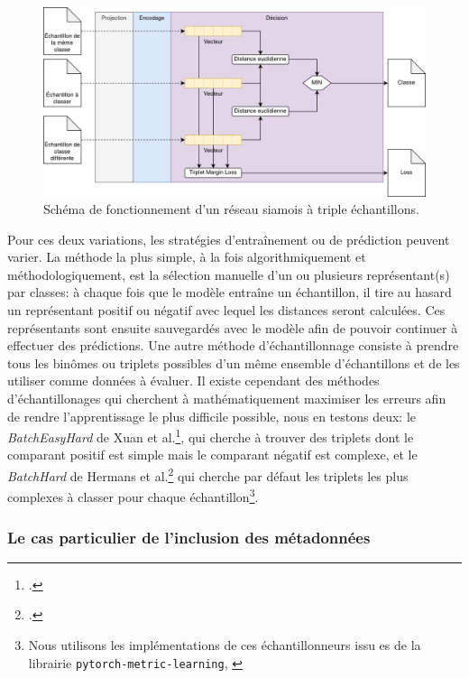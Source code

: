 \begin{figure}[ht]
    \centering
    \includegraphics[width=\linewidth]{figures/chap4/triplet.png}
    \caption{Schéma de fonctionnement d'un réseau siamois à triple échantillons.}
    \label{fig:chap4:reseau:Triplet}
\end{figure}

Pour ces deux variations, les stratégies d'entraînement ou de prédiction peuvent varier. La méthode la plus simple, à la fois algorithmiquement et méthodologiquement, est la sélection manuelle d'un ou plusieurs représentant(s) par classes: à chaque fois que le modèle entraîne un échantillon, il tire au hasard un représentant positif ou négatif avec lequel les distances seront calculées. Ces représentants sont ensuite sauvegardés avec le modèle afin de pouvoir continuer à effectuer des prédictions. Une autre méthode d'échantillonnage consiste à prendre tous les binômes ou triplets possibles d'un même ensemble d'échantillons et de les utiliser comme données à évaluer. Il existe cependant des méthodes d'échantillonages qui cherchent à mathématiquement maximiser les erreurs afin de rendre l'apprentissage le plus difficile possible, nous en testons deux: le \textit{BatchEasyHard} de Xuan et al.\footcite{xuan_improved_2020}, qui cherche à trouver des triplets dont le comparant positif est simple mais le comparant négatif est complexe, et le \textit{BatchHard} de Hermans et al.\footcite{hermans_defense_2017} qui cherche par défaut les triplets les plus complexes à classer pour chaque échantillon\footnote{Nous utilisons les implémentations de ces échantillonneurs issu es de la librairie \texttt{pytorch-metric-learning}, \textcite{musgrave2020pytorch}}. 

\subsubsection{Le cas particulier de l'inclusion des métadonnées}
\label{chap4:part2:metadata}

